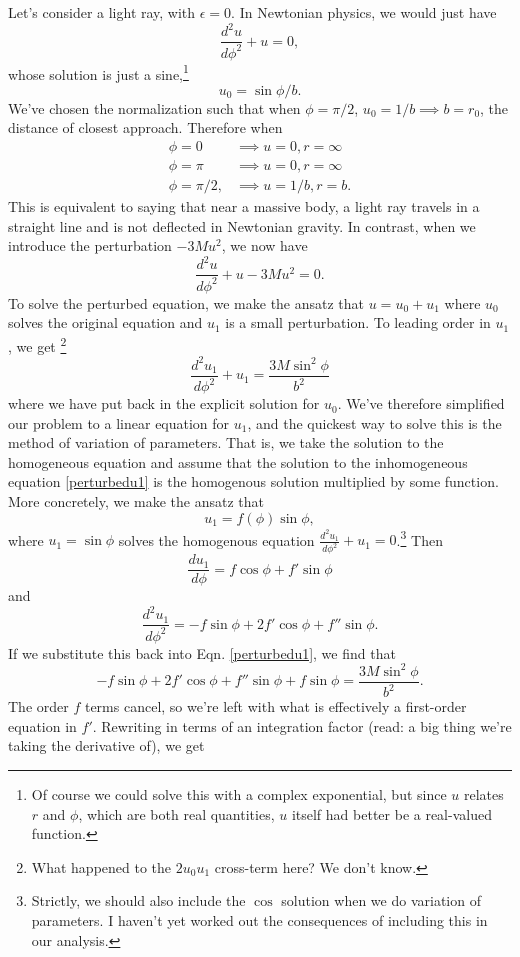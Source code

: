 Let's consider a light ray, with $\epsilon=0$. In Newtonian physics, we would just have
$$\frac{d^2u}{d\phi^2}+u=0,$$ whose solution is just a sine,\footnote{Of course we could solve this with a complex exponential, but since $u$ relates $r$ and $\phi$, which are both real quantities, $u$ itself had better be a real-valued function.} $$u_0=\sin\phi/b.$$ We've chosen the normalization such that when $\phi=\pi/2$, $u_0=1/b\implies b=r_0$, the distance of closest approach. Therefore when
\begin{align*}
    \phi=0 &\implies u=0,r=\infty\\
    \phi=\pi &\implies u=0, r=\infty\\
    \phi=\pi/2, &\implies u=1/b, r=b.
\end{align*}
This is equivalent to saying that near a massive body, a light ray travels in a straight line and is not deflected in Newtonian gravity. In contrast, when we introduce the perturbation $-3Mu^2$, we now have
\begin{equation}
\frac{d^2u}{d\phi^2}+u-3Mu^2=0.
\end{equation}
To solve the perturbed equation, we make the ansatz that $u=u_0+u_1$ where $u_0$ solves the original equation and $u_1$ is a small perturbation. To leading order in $u_1$, we get%
    \footnote{What happened to the $2u_0u_1$ cross-term here? We don't know.}
\begin{equation}\label{perturbedu1}
    \frac{d^2u_1}{d\phi^2}+u_1=\frac{3M\sin^2\phi}{b^2}
\end{equation}
where we have put back in the explicit solution for $u_0$.
We've therefore simplified our problem to a linear equation for $u_1$, and the quickest way to solve this is the method of variation of parameters. That is, we take the solution to the homogeneous equation and assume that the solution to the inhomogeneous equation \ref{perturbedu1} is the homogenous solution multiplied by some function. More concretely, we make the ansatz that $$u_1=f(\phi)\sin\phi,$$ where $u_1=\sin\phi$ solves the homogenous equation $\frac{d^2u_1}{d\phi^2}+u_1=0$.\footnote{Strictly, we should also include the $\cos$ solution when we do variation of parameters. I haven't yet worked out the consequences of including this in our analysis.} Then
$$\frac{du_1}{d\phi}=f\cos\phi+f' \sin\phi$$
and
$$\frac{d^2u_1}{d\phi^2}=-f\sin\phi+2f' \cos\phi+f''\sin\phi.$$
If we substitute this back into Eqn. \ref{perturbedu1}, we find that
$$-f\sin\phi+2f'\cos\phi+f''\sin\phi+f\sin\phi=\frac{3M\sin^2\phi}{b^2}.$$
The order $f$ terms cancel, so we're left with what is effectively a first-order equation in $f'$. Rewriting in terms of an integration factor (read: a big thing we're taking the derivative of), we get
